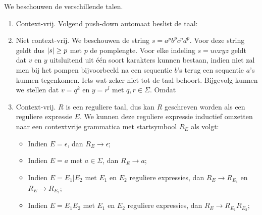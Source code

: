 \documentclass{article}
\begin{document}
\begin{answer}
We beschouwen de verschillende talen.
\begin{enumerate}
 \item Context-vrij. Volgend push-down automaat beslist de taal:
 \begin{center}
 \end{center}
 \item Niet context-vrij. We beschouwen de string $s=a^pb^pc^pd^p$. Voor deze string geldt dus $\left|s\right|\geq p$ met $p$ de pomplengte. Voor elke indeling $s=uvxyz$ geldt dat $v$ en $y$ uitsluitend uit \'e\'en soort karakters kunnen bestaan, indien niet zal men bij het pompen bijvoorbeeld na een sequentie $b$'s terug een sequentie $a$'s kunnen tegenkomen. Iets wat zeker niet tot de taal behoort. Bijgevolg kunnen we stellen dat $v=q^k$ en $y=r^l$ met $q,r\in\Sigma$. Omdat 
 \item Context-vrij. $R$ is een reguliere taal, dus kan $R$ geschreven worden als een reguliere expressie $E$. We kunnen deze reguliere expressie inductief omzetten naar een contextvrije grammatica met startsymbool $R_E$ als volgt:
 \begin{itemize}
  \item Indien $E=\epsilon$, dan $R_E\rightarrow\epsilon$;
  \item Indien $E=a$ met $a\in\Sigma$, dan $R_E\rightarrow a$;
  \item Indien $E=E_1|E_2$ met $E_1$ en $E_2$ reguliere expressies, dan $R_E\rightarrow R_{E_1}$ en $R_E\rightarrow R_{E_2}$;
  \item Indien $E=E_1E_2$ met $E_1$ en $E_2$ reguliere expressies, dan $R_E\rightarrow R_{E_1}R_{E_2}$;

\end{itemize}
\end{enumerate}
\end{answer}
\end{document}
